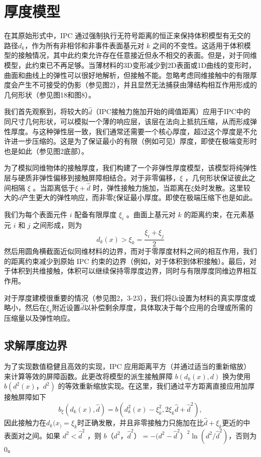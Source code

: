 \section{厚度模型}

在其原始形式中，IPC 通过强制执行无符号距离的恒正来保持体积模型有无交的路径$d_k$，作为所有非相邻和非事件表面基元对 $k$ 之间的不变性。这适用于体积模型的接触情况，其中此约束允许存在任意接近但永不相交的表面。但是，对于同维模型，此约束已不再足够。当薄材料的3D变形减少到2D表面或1D曲线的变形时，曲面和曲线上的弹性可以很好地解析，但接触不能。忽略考虑同维接触中的有限厚度会产生不可接受的伪影（参见图2），并且显然无法捕获由薄结构相互作用形成的几何形状（参见图18和图8）。

我们首先观察到，将较大的$\hat d$（IPC接触力施加开始的阈值距离）应用于IPC中的同尺寸几何形状，可以模拟一个薄的响应层，该层在法向上抵抗压缩，从而形成弹性厚度。与这种弹性层一致，我们通常还需要一个核心厚度，超过这个厚度是不允许进一步压缩的。这是为了保证最小的有限（例如可见）厚度，即使在极端变形时也是如此（参见图2底部）。

为了模拟同维物体的接触厚度，我们构建了一个非弹性厚度模型，该模型将纯弹性层与硬质非弹性偏移到接触屏障相结合。对于非零偏移，$\xi$ ，几何形状保证彼此之间相隔 $\xi$ 。当距离低于$\xi + \hat d$ 时，弹性接触力施加，当距离在$\xi$处时发散。这里较大的$d$产生更大的弹性响应，而非零$\xi$保证最小厚度。即使在极端压缩下也是如此。

我们为每个表面元件 $i$ 配备有限厚度 $\xi_ i$ 。曲面上基元对 $k$ 的距离约束，在元素基元 $i$ 和 $j$ 之间形成，则为
\begin{equation}
  d_k(x) > \xi_k = \frac{\xi_i + \xi_j}{2}
\end{equation}
然后用圆角横截面近似同维材料的边界，而对于零厚度材料之间的相互作用，我们的距离约束减少到原始 IPC 约束的边界（例如，对于体积到体积接触）。最后，对于体积到共维接触，体积可以继续保持零厚度边界，同时与有限厚度同维边界相互作用。

对于厚度建模很重要的情况（参见图2，3-23），我们将ξk设置为材料的真实厚度或略小，然后在$\xi_k$附近设置$\hat d$以补偿剩余厚度，具体取决于每个应用的合理或所需的压缩量以及弹性响应。

\subsection{求解厚度边界}

为了实现数值稳健且高效的实现，IPC 应用距离平方（并通过适当的重新缩放）来计算等效的屏障函数。此更改将模型的派生接触屏障 $b(d_k(x), d)$ 换为使用 $b(d^2(x)， d^2)$ 的等效重新缩放实现。在这里，我们通过平方距离直接应用加厚接触屏障如下
\begin{equation}
  b_\xi (d_k (x), \hat d) = b(d_k^2 (x) - \xi_k^2, 2\xi_k\hat d + \hat d^2),
\end{equation}
因此接触力在$d_k (x_ )= \xi_k$时正确发散，并且非零接触力只施加在比$\hat d + \xi_k$更近的中表面对之间。如果 $d^2 < \hat d^2$ ，则 $b（d^2 ， \hat d^2 ） = −(d^2 − \hat d ^ 2 ） ^2 \ln(d^2 / \hat d^2)$，否则为 0。

